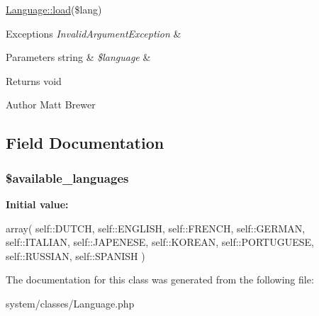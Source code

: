 \hyperlink{class_language_ad201e53a19768db4164a0e617ade296a}{Language::load}(\$lang) 
\begin{DoxyExceptions}{Exceptions}
{\em InvalidArgumentException} & \\
\hline
\end{DoxyExceptions}

\begin{DoxyParams}[1]{Parameters}
string & {\em \$language} & \\
\hline
\end{DoxyParams}
\begin{DoxyReturn}{Returns}
void 
\end{DoxyReturn}
\begin{DoxyAuthor}{Author}
Matt Brewer 
\end{DoxyAuthor}


\subsection{Field Documentation}
\hypertarget{class_language_acfd919cfddfa9d0455035bf186b96050}{
\subsubsection[{\$available\_\-languages}]{\setlength{\rightskip}{0pt plus 5cm}\$available\_\-languages}}
\label{class_language_acfd919cfddfa9d0455035bf186b96050}
{\bfseries Initial value:}
\begin{DoxyCode}
 array(
                        self::DUTCH, 
                        self::ENGLISH, 
                        self::FRENCH,
                        self::GERMAN,
                        self::ITALIAN,
                        self::JAPENESE,
                        self::KOREAN,
                        self::PORTUGUESE,
                        self::RUSSIAN,
                        self::SPANISH
                )
\end{DoxyCode}


The documentation for this class was generated from the following file:\begin{DoxyCompactItemize}
\item 
system/classes/Language.php\end{DoxyCompactItemize}
